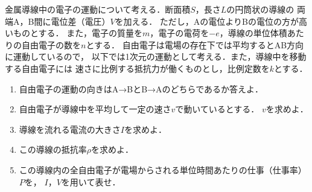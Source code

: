 ﻿\documentclass[../../../ps_q.tex]{subfiles}
\begin{document}
    金属導線中の電子の運動について考える．断面積$S$，長さ$L$の円筒状の導線の%
    両端A，B間に電位差（電圧）$V$を加える．%
    ただし，Aの電位よりBの電位の方が高いものとする．%
    また，電子の質量を$m$，電子の電荷を$-e$，導線の単位体積あたりの自由電子の数を$n$とする．%
    自由電子は電場の存在下では平均するとAB方向に運動しているので，%
    以下では1次元の運動として考える．また，導線中を移動する自由電子には%
    速さに比例する抵抗力が働くものとし，比例定数を$k$とする．
    
    \begin{enumerate}
        \item%
            自由電子の運動の向きはA→BとB→Aのどちらであるか答えよ．
        \item%
            自由電子が導線中を平均して一定の速さ$v$で動いているとする．%
            $v$を求めよ．
        \item%
            導線を流れる電流の大きさ$I$を求めよ．
        \item%
            この導線の抵抗率$\rho$を求めよ．
        \item%
            この導線内の全自由電子が電場からされる単位時間あたりの仕事（仕事率）$P$を，%
            $I$，$V$を用いて表せ．
    \end{enumerate}
\end{document}
